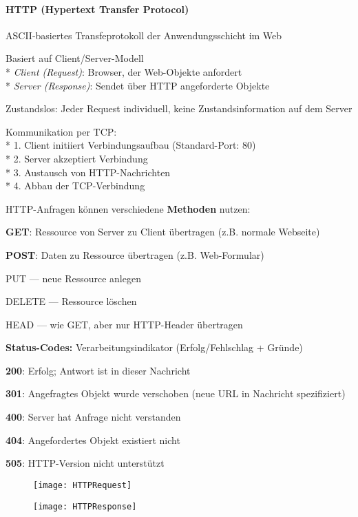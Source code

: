 \paragraph{HTTP (Hypertext Transfer Protocol)}
\begin{items}
  \item ASCII-basiertes Transfeprotokoll der Anwendungsschicht im Web
  \item Basiert auf Client/Server-Modell \\*
    \emph{Client (Request)}: Browser, der Web-Objekte anfordert\\*
    \emph{Server (Response)}: Sendet über HTTP angeforderte Objekte
  \item Zustandslos: Jeder Request individuell, keine Zustandsinformation auf dem Server
  \item Kommunikation per TCP: \\*
    1. Client initiiert Verbindungsaufbau (Standard-Port: 80) \\*
    2. Server akzeptiert Verbindung \\*
    3. Austausch von HTTP-Nachrichten \\*
    4. Abbau der TCP-Verbindung
	\smallskip
  \item HTTP-Anfragen können verschiedene \textbf{Methoden} nutzen:
  \item \textbf{GET}: Ressource von Server zu Client übertragen (z.B. normale Webseite)
  \item \textbf{POST}: Daten zu Ressource übertragen (z.B. Web-Formular)
  \item PUT --- neue Ressource anlegen
  \item DELETE --- Ressource löschen
  \item HEAD --- wie GET, aber nur HTTP-Header übertragen
   \smallskip
  \item \textbf{Status-Codes:} Verarbeitungsindikator (Erfolg/Fehlschlag + Gründe)
  \item \textbf{200}: Erfolg; Antwort ist in dieser Nachricht
  \item \textbf{301}: Angefragtes Objekt wurde verschoben (neue URL in Nachricht spezifiziert)
  \item \textbf{400}: Server hat Anfrage nicht verstanden
  \item \textbf{404}: Angefordertes Objekt existiert nicht
  \item \textbf{505}: HTTP-Version nicht unterstützt
\end{items}
  \begin{figure}[H]\centering\texttt{[image: HTTPRequest]}\end{figure}
\begin{figure}[H]\centering\texttt{[image: HTTPResponse]}\end{figure}

